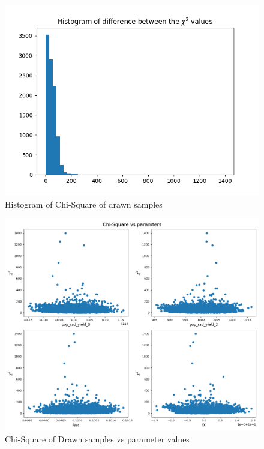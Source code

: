 \documentclass[12pt, TexShade, letterpaper]{report}
\begin{document}
\begin{figure}[h!]
\centering
\includegraphics[scale =0.9]{csq_hist_known_curve.png}
\caption[Histogram of Chi-Square of drawn samples]{Histogram of Chi-Square of drawn samples}
\label{fig:csq_hist_known_curve}
\end{figure}

\begin{figure}[h!]
\centering
\includegraphics[scale =0.5]{csq_vs_params_knwon_curve.png}
\caption[Chi-Square of Drawn samples vs parameter values]{Chi-Square of Drawn samples vs parameter values}
\label{fig:csq_vs_params_knwon_curve}
\end{figure}
\end{document}
